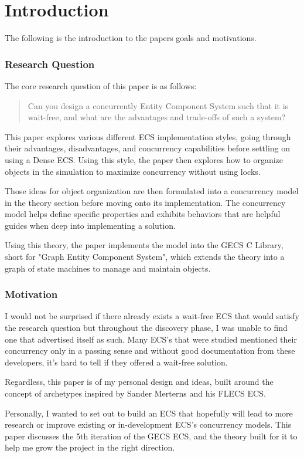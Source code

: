 \section{Introduction}

The following is the introduction to the papers goals and motivations.

\subsubsection{Research Question}

The core research question of this paper is as follows:

\blockquote{Can you design a concurrently Entity Component System such that it is wait-free, and what are the advantages and trade-offs of such a system?}

This paper explores various different ECS implementation styles, going through their advantages, disadvantages, and concurrency capabilities before settling on using a Dense ECS. Using this style, the paper then explores how to organize objects in the simulation to maximize concurrency without using locks. 

Those ideas for object organization are then formulated into a concurrency model in the theory section before moving onto its implementation. The concurrency model helps define specific properties and exhibits behaviors that are helpful guides when deep into implementing a solution. 

Using this theory, the paper implements the model into the GECS C Library, short for "Graph Entity Component System", which extends the theory into a graph of state machines to manage and maintain objects.

\subsubsection{Motivation}

I would not be surprised if there already exists a wait-free ECS that would satisfy the research question but throughout the discovery phase, I was unable to find one that advertised itself as such. Many ECS's that were studied mentioned their concurrency only in a passing sense and without good documentation from these developers, it's hard to tell if they offered a wait-free solution.

Regardless, this paper is of my personal design and ideas, built around the concept of archetypes inspired by Sander Merterns and his FLECS ECS.

Personally, I wanted to set out to build an ECS that hopefully will lead to more research or improve existing or in-development ECS's concurrency models. This paper discusses the 5th iteration of the GECS ECS, and the theory built for it to help me grow the project in the right direction.

\newpage